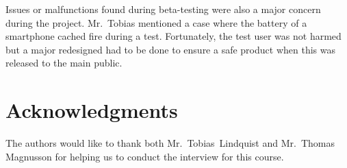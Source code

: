 \documentclass[conference]{IEEEtran}
\begin{document}
Issues or malfunctions found during beta-testing were also a major concern during the project. Mr.~Tobias mentioned a case where the battery of a smartphone cached fire during a test. Fortunately, the test user was not harmed but a major redesigned had to be done to ensure a safe product when this was released to the main public.

\section*{Acknowledgments}
The authors would like to thank both  Mr.~Tobias~Lindquist and Mr.~Thomas Magnusson for helping us to conduct the interview for this course.
\end{document}

